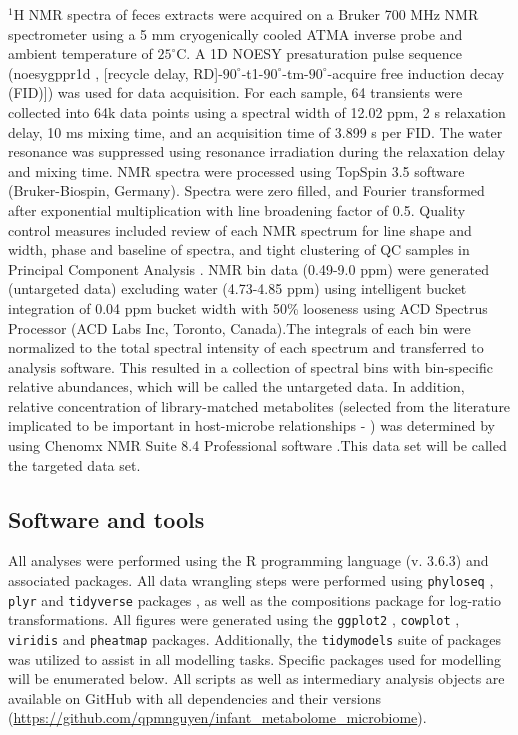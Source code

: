 $^1$H NMR spectra of feces extracts were acquired on a Bruker 700 MHz NMR spectrometer using a 5 mm cryogenically cooled ATMA inverse probe and ambient temperature of $25^{\circ}$C. A 1D NOESY presaturation pulse sequence (noesygppr1d \cite{beckonert2007metabolic, dona2014precision}, [recycle delay, RD]-$90^{\circ}$-t1-$90^{\circ}$-tm-$90^{\circ}$-acquire free induction decay (FID)]) was used for data acquisition. For each sample, 64 transients were collected into 64k data points using a spectral width of 12.02 ppm, 2 s relaxation delay, 10 ms mixing time, and an acquisition time of 3.899 s per FID. The water resonance was suppressed using resonance irradiation during the relaxation delay and mixing time. NMR spectra were processed using TopSpin 3.5 software (Bruker-Biospin, Germany). Spectra were zero filled, and Fourier transformed after exponential multiplication with line broadening factor of 0.5. Quality control measures included review of each NMR spectrum for line shape and width, phase and baseline of spectra, and tight clustering of QC samples in Principal Component Analysis \cite{broadhurst2018guidelines}. NMR bin data (0.49-9.0 ppm) were generated (untargeted data) excluding water (4.73-4.85 ppm) using intelligent bucket integration of 0.04 ppm bucket width with 50\% looseness using ACD Spectrus Processor (ACD Labs Inc, Toronto, Canada).The integrals of each bin were normalized to the total spectral intensity of each spectrum and transferred to analysis software. This resulted in a collection of spectral bins with bin-specific relative abundances, which will be called the untargeted data. In addition, relative concentration of library-matched metabolites (selected from the literature implicated to be important in host-microbe relationships - ) was determined by using Chenomx NMR Suite 8.4 Professional software \cite{weljie2006targeted}.This data set will be called the targeted data set. 

\subsection{Software and tools}

All analyses were performed using the R programming language (v. 3.6.3) \cite{rcoreteam2021language} and associated packages. All data wrangling steps were performed using \texttt{phyloseq} \cite{mcmurdie2013phyloseq}, \texttt{plyr} and \texttt{tidyverse} packages \cite{wickham2011splitapplycombine}, as well as the compositions package \cite{vandenboogaart2019compositions} for log-ratio transformations. All figures were generated using the \texttt{ggplot2} \cite{wickham2016ggplot2}, \texttt{cowplot} \cite{wilke2019cowplot}, \texttt{viridis} \cite{garnier2018viridis} and \texttt{pheatmap} \cite{kolde2019pheatmap} packages. Additionally, the \texttt{tidymodels} \cite{kuhn2020tidymodels} suite of packages was utilized to assist in all modelling tasks. Specific packages used for modelling will be enumerated below. All scripts as well as intermediary analysis objects are available on GitHub with all dependencies and their versions (\url{https://github.com/qpmnguyen/infant_metabolome_microbiome}). 

